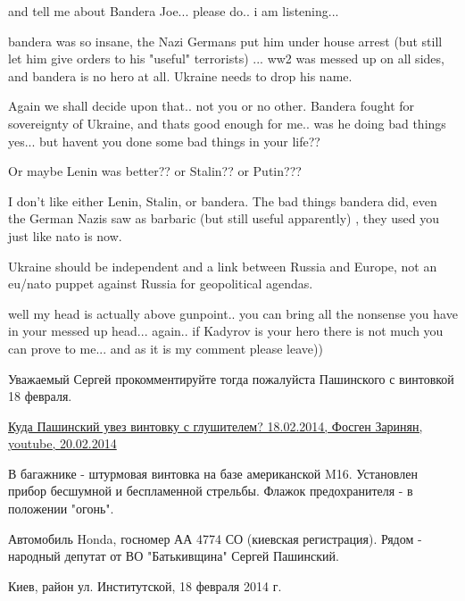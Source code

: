 \begin{itemize}
\begin{itemize}

and tell me about Bandera Joe... please do.. i am listening...


bandera was so insane, the Nazi Germans put him under house arrest (but still
let him give orders to his "useful" terrorists) ... ww2 was messed up on all
sides, and bandera is no hero at all. Ukraine needs to drop his name.


Again we shall decide upon that.. not you or no other. Bandera fought for
sovereignty of Ukraine, and thats good enough for me.. was he doing bad things
yes... but havent you done some bad things in your life??


Or maybe Lenin was better?? or Stalin?? or Putin???


I don't like either Lenin, Stalin, or bandera. The bad things bandera did, even
the German Nazis saw as barbaric (but still useful apparently) , they used you
just like nato is now.

Ukraine should be independent and a link between Russia and Europe, not an
eu/nato puppet against Russia for geopolitical agendas.


well my head is actually above gunpoint.. you can bring all the nonsense you
have in your messed up head... again.. if Kadyrov is your hero there is not much
you can prove to me... and as it is my comment please leave))


Уважаемый Сергей
прокомментируйте тогда пожалуйста Пашинского с винтовкой 18 февраля.

\href{https://www.youtube.com/watch?v=Sxmi87ILEQ4}{%
Куда Пашинский увез винтовку с глушителем? 18.02.2014, Фосген Заринян, youtube, 20.02.2014%
}

В багажнике - штурмовая винтовка на базе американской M16.  Установлен прибор
бесшумной и беспламенной стрельбы.  Флажок предохранителя - в положении
"огонь".

Автомобиль Honda, госномер АА 4774 СО (киевская регистрация).  Рядом - народный
депутат от ВО "Батькивщина" Сергей Пашинский.

Киев, район ул. Институтской, 18 февраля 2014 г.



\end{itemize}
\end{itemize}
